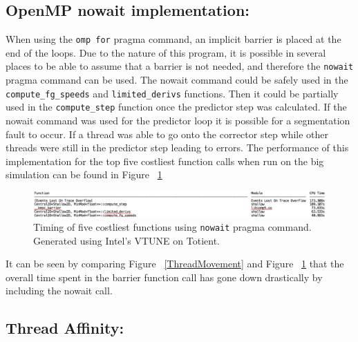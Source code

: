 \documentclass[12pt]{article}
\begin{document}
		\subsection{OpenMP nowait implementation:}
		
		When using the \texttt{omp for} pragma command, an implicit barrier is placed at the end of the loops. Due to the nature of this program, it is possible in several places to be able to assume that a barrier is not needed, and therefore the \texttt{nowait} pragma command can be used. The nowait command could be safely used in the \texttt{compute\_fg\_speeds} and \texttt{limited\_derivs} functions. Then it could be partially used in the \texttt{compute\_step} function once the predictor step was calculated. If the nowait command was used for the predictor loop it is possible for a segmentation fault to occur. If a thread was able to go onto the corrector step while other threads were still in the predictor step leading to errors. The performance of this implementation for the top five costliest function calls when run on the big simulation  can be found in Figure ~\ref{bindoff}
		
		\begin{figure}[h]
			\begin{center}
				\includegraphics[width=0.8\columnwidth]{bindoff}
				\caption{Timing of five costliest functions using \texttt{nowait} pragma command. Generated using Intel's VTUNE on Totient.}
				\label{bindoff}
			\end{center}
		\end{figure}
		
		\noindent It can be seen by comparing Figure  ~\ref{ThreadMovement} and Figure ~\ref{bindoff} that the overall time spent in the barrier function call has gone down drastically by including the nowait call.
		
		\subsection{Thread Affinity:}
		
\end{document}
